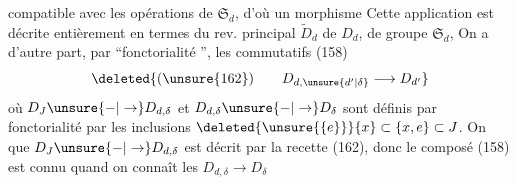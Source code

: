 compatible avec les opérations de $\mathfrak S_d$, d'où un morphisme
 Cette application est décrite entièrement en termes du rev. principal $\widetilde D_d$ de $D_d$, de groupe $\mathfrak S_d$,  On a d'autre part, par ``fonctorialité '', les  commutatifs  (158)
\[
\deleted{(\unsure{162})\qquad D_{d,\unsure{d'|\delta}}\longrightarrow D_{d'}}
\]
où $D_J\unsure{-|\to}D_{d,\delta}$ et $D_{d,\delta}\unsure{-|\to}D_\delta$ sont définis par fonctorialité par les inclusions $\deleted{\unsure{\{e\}}}\{x\}\subset\{x,e\}\subset J$. On  que $D_J\unsure{-|\to}D_{d,\delta}$ est décrit par la recette (162), donc le composé (158) est connu quand on connaît les $D_{d,\delta}\longrightarrow D_\delta$
